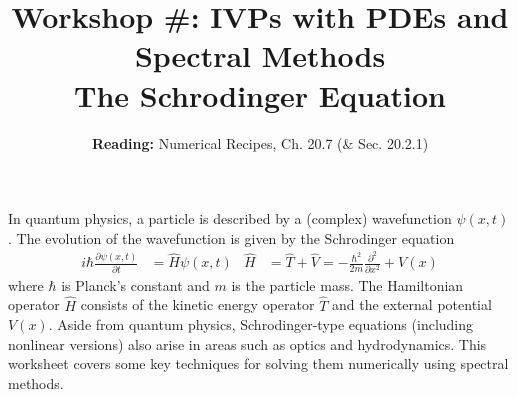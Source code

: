 \documentclass[11pt]{article}
\title{Workshop \#: IVPs with PDEs and Spectral Methods \\ The  Schrodinger Equation }
\author{\textbf{Reading:} Numerical Recipes, Ch. 20.7 (\& Sec. 20.2.1)}
\date{}                                           %
\begin{document}
\maketitle

In quantum physics, a particle is described by a (complex) wavefunction $\psi(x,t)$. The evolution of the wavefunction is given by the Schrodinger equation
\begin{align}
i \hbar \frac{\partial \psi (x,t)}{\partial t}  &= \hat H  \psi(x,t) & \hat H &= \hat T + \hat V  =   -\frac{\hbar^2 }{2m} \frac{
\partial^2}{\partial x^2} + V(x)
\end{align}
where $\hbar$ is Planck's constant and $m$ is the particle mass. The Hamiltonian operator $\hat H$  consists of the kinetic energy operator $\hat T$ and the external potential $V(x)$. Aside from quantum physics, Schrodinger-type equations (including nonlinear versions) also arise in areas such as optics and hydrodynamics. This worksheet covers some key techniques for solving them numerically using spectral methods.
\end{document}
